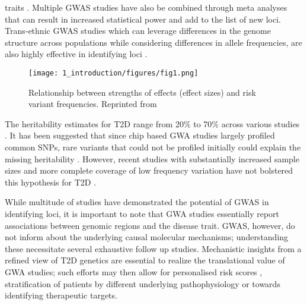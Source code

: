 traits \cite{fuchsbergerGeneticArchitectureType2016a, mahajanRefiningAccuracyValidated2018, mahajanFinemappingTypeDiabetes2018}. Multiple GWAS studies have also be combined through meta analyses that can result in increased statistical power and add to the list of new loci. Trans-ethnic GWAS studies which can leverage differences in the genome structure across populations while considering differences in allele frequencies, are also highly effective in identifying loci \cite{prasadGeneticsTypeDiabetes2015, diabetesgeneticsreplicationandmeta-analysisdiagramconsortiumGenomewideTransancestryMetaanalysis2014, liTransethnicGenomewideAssociation2014}. 


\begin{figure}
        \centering
        \texttt{[image: 1\_introduction/figures/fig1.png]}
        \caption{Relationship between strengths of effects (effect sizes) and risk variant frequencies. Reprinted from \cite{manolioFindingMissingHeritability2009}}
        \label{fig:ci_f1}
\end{figure}


The heritability estimates for T2D range from 20\% to 70\% across various studies \cite{poulsenHeritabilityTypeII1999, almgrenHeritabilityFamilialityType2011, prasadGeneticsTypeDiabetes2015, mahajanFinemappingTypeDiabetes2018}. It has been suggested that since chip based GWA studies largely profiled common SNPs, rare variants that could not be profiled initially could explain the missing heritability \cite{dicksonRareVariantsCreate2010}. However, recent studies with substantially increased sample sizes and more complete coverage of low frequency variation have not bolstered this hypothesis for T2D \cite{mahajanRefiningAccuracyValidated2018}.


While multitude of studies have demonstrated the potential of GWAS in identifying loci, it is important to note that GWA studies essentially report associations between genomic regions and the disease trait. GWAS, however, do not inform about the underlying causal molecular mechanisms; understanding these necessitate several exhaustive follow up studies. Mechanistic insights from a refined view of T2D genetics are essential to realize the translational value of GWA studies; such efforts may then allow for personalised risk scores \cite{kheraGenomewidePolygenicScores2018}, stratification of patients by different underlying pathophysiology \cite{udlerTypeDiabetesGenetic2018} or towards identifying therapeutic targets.
                                
